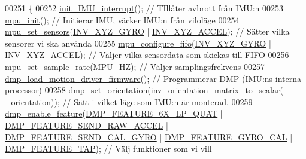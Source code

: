\begin{DoxyCode}
00251 \{
00252     \hyperlink{sensor_8c_ad53a97524cf65efb444e93e9061d9353}{init\_IMU\_interrupt}();                                                 \textcolor{comment}{// TIllåter
       avbrott från IMU:n}
00253     \hyperlink{group___d_r_i_v_e_r_s_ga63637cf3771995aeda99d91d5f345f29}{mpu\_init}();                                                             \textcolor{comment}{// Initierar IMU,
       väcker IMU:n från viloläge}
00254     \hyperlink{group___d_r_i_v_e_r_s_ga6e77e7cc1cf6be5e8fdf617c5b4586d1}{mpu\_set\_sensors}(\hyperlink{group___d_r_i_v_e_r_s_ga3fdc30f9c0a26c2c4e2bb88921f91629}{INV\_XYZ\_GYRO} | \hyperlink{group___d_r_i_v_e_r_s_gaa03f025a17ed491e70b88274e89c75c5}{INV\_XYZ\_ACCEL});                          \textcolor{comment}{
      // Sätter vilka sensorer vi ska använda}
00255     \hyperlink{group___d_r_i_v_e_r_s_gababbdda287e1f19323489f90a0889dd7}{mpu\_configure\_fifo}(\hyperlink{group___d_r_i_v_e_r_s_ga3fdc30f9c0a26c2c4e2bb88921f91629}{INV\_XYZ\_GYRO} | 
      \hyperlink{group___d_r_i_v_e_r_s_gaa03f025a17ed491e70b88274e89c75c5}{INV\_XYZ\_ACCEL});                        \textcolor{comment}{// Väljer vilka sensordata som skickas till FIFO}
00256     \hyperlink{group___d_r_i_v_e_r_s_ga0144d666a67a82888b8580002afe8b55}{mpu\_set\_sample\_rate}(\hyperlink{sensor_8h_a7f881c6b2bb1dccd733c018dff655691}{MPU\_HZ});                                           \textcolor{comment}{//
       Väljer samplingsfrekvens}
00257     \hyperlink{group___d_r_i_v_e_r_s_ga66626a842452f444e9af29cb0d2c6150}{dmp\_load\_motion\_driver\_firmware}();                                       \textcolor{comment}{
      // Programmerar DMP (IMU:ns interna processor)}
00258     \hyperlink{group___d_r_i_v_e_r_s_ga6cb5ff144ce6e1546f00809de8bb24a4}{dmp\_set\_orientation}(inv\_orientation\_matrix\_to\_scalar(
      \hyperlink{sensor_8h_abc4898c1a34c444db2963e65dccbf97c}{\_orientation})); \textcolor{comment}{// Sätt i vilket läge som IMU:n är monterad.}
00259     \hyperlink{group___d_r_i_v_e_r_s_ga70c485bdfa30515e5b869b081192caa1}{dmp\_enable\_feature}(\hyperlink{group___d_r_i_v_e_r_s_gae879a3c9729f9e1be5e6d7c9211c69c0}{DMP\_FEATURE\_6X\_LP\_QUAT} | 
      \hyperlink{group___d_r_i_v_e_r_s_ga9eeb257febe4a305df7ad4cf31dc2755}{DMP\_FEATURE\_SEND\_RAW\_ACCEL} | \hyperlink{group___d_r_i_v_e_r_s_ga40462c6fd55b04b2f79723dd737ee795}{DMP\_FEATURE\_SEND\_CAL\_GYRO} |
       \hyperlink{group___d_r_i_v_e_r_s_gaaf0ac890c1f83106c08b722f1e865fdb}{DMP\_FEATURE\_GYRO\_CAL} | \hyperlink{group___d_r_i_v_e_r_s_ga87fac39cf95e2c56afdf507a986fa00b}{DMP\_FEATURE\_TAP}); \textcolor{comment}{// Välj funktioner som vi vill
}
\end{DoxyCode}
